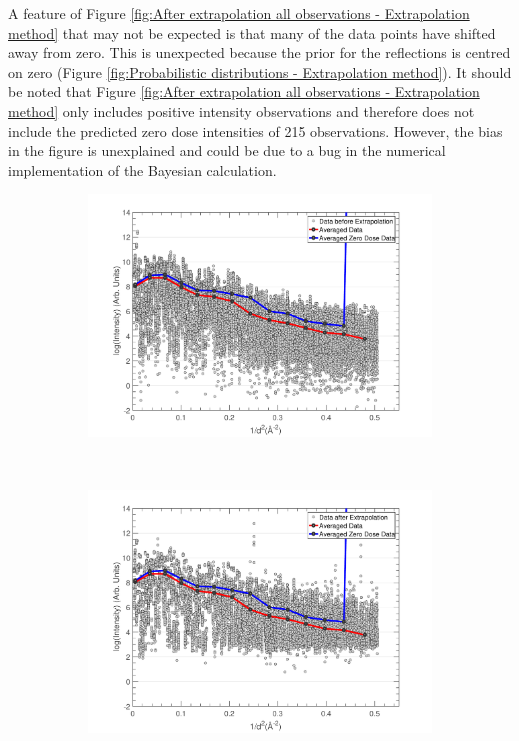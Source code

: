 A feature of Figure \ref{fig:After extrapolation all observations - Extrapolation method} that may not be expected is that many of the data points have shifted away from zero.
This is unexpected because the prior for the reflections is centred on zero (Figure \ref{fig:Probabilistic distributions - Extrapolation method}).
It should be noted that Figure \ref{fig:After extrapolation all observations - Extrapolation method} only includes positive intensity observations and therefore does not include the predicted zero dose intensities of 215 observations.
However, the bias in the figure is unexplained and could be due to a bug in the numerical implementation of the Bayesian calculation.
\begin{figure}
	\centering
	\begin{subfigure}[b]{0.95\textwidth}
		\centering
		\includegraphics[width=\textwidth]{figures/zde/IntensityCurve_BeforeExtrapolation.pdf}
		\caption{}
		\label{fig:Before extrapolation all observations - Extrapolation method}
	\end{subfigure}
	\\
	\begin{subfigure}[b]{0.95\textwidth}
		\centering
		\includegraphics[width=\textwidth]{figures/zde/IntensityCurve_AfterExtrapolation.pdf}

\end{subfigure}
\end{figure}

